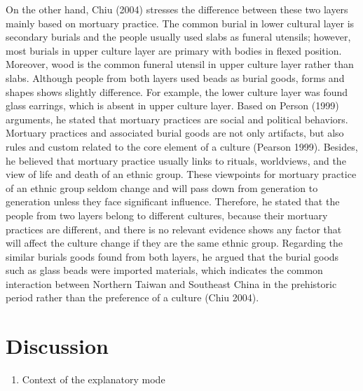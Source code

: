 \documentclass[10pt]{article}
\begin{document}
On the other hand, Chiu (2004) stresses the difference between these two
layers mainly based on mortuary practice. The common burial in lower
cultural layer is secondary burials and the people usually used slabs as
funeral utensils; however, most burials in upper culture layer are
primary with bodies in flexed position. Moreover, wood is the common
funeral utensil in upper culture layer rather than slabs. Although
people from both layers used beads as burial goods, forms and shapes
shows slightly difference. For example, the lower culture layer was
found glass earrings, which is absent in upper culture layer. Based on
Person (1999) arguments, he stated that mortuary practices are social
and political behaviors. Mortuary practices and associated burial goods
are not only artifacts, but also rules and custom related to the core
element of a culture (Pearson 1999). Besides, he believed that mortuary
practice usually links to rituals, worldviews, and the view of life and
death of an ethnic group. These viewpoints for mortuary practice of an
ethnic group seldom change and will pass down from generation to
generation unless they face significant influence. Therefore, he stated
that the people from two layers belong to different cultures, because
their mortuary practices are different, and there is no relevant
evidence shows any factor that will affect the culture change if they
are the same ethnic group. Regarding the similar burials goods found
from both layers, he argued that the burial goods such as glass beads
were imported materials, which indicates the common interaction between
Northern Taiwan and Southeast China in the prehistoric period rather
than the preference of a culture (Chiu 2004).

\section*{Discussion}\label{discussion}

\begin{enumerate}
\def\labelenumi{\arabic{enumi}.}
\itemsep1pt\parskip0pt
\item
  Context of the explanatory mode
\end{enumerate}
\end{document}
